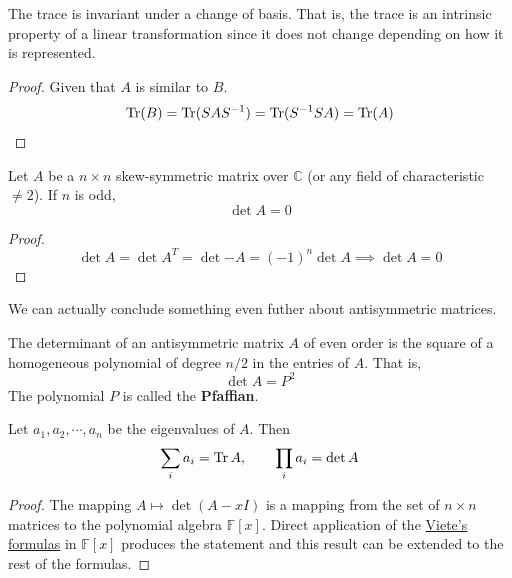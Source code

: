   \begin{corollary}
    \label{thm:invariance-of-the-trace-under-change-of-basis}
    The trace is invariant under a change of basis. That is, the trace is an intrinsic property of a linear transformation since it does not change depending on how it is represented. 
  \end{corollary}
  \begin{proof}
    Given that $A$ is similar to $B$. 
    \begin{equation}
      \operatorname{Tr}(B) = \operatorname{Tr}(S A S^{-1}) = \operatorname{Tr}(S^{-1} S A) = \operatorname{Tr}(A) 
    \end{equation}
  \end{proof}

  \begin{theorem}
    \label{thm:odd-order-skew-symmetric-matrices-are-singular}
    Let $A$ be a $n \times n$ skew-symmetric matrix over $\mathbb{C}$ (or any field of characteristic $\neq 2$). If $n$ is odd, 
    \begin{equation}
      \det{A} = 0 
    \end{equation}
  \end{theorem}
  \begin{proof}
    \begin{equation}
      \det{A} = \det{A^T} = \det{-A} = (-1)^n \det{A} \implies \det{A} = 0 
    \end{equation}
  \end{proof}

  We can actually conclude something even futher about antisymmetric matrices. 

  \begin{theorem}[Pfaffian]
    \label{thm:pfaffian}
    The determinant of an antisymmetric matrix $A$ of even order is the square of a homogeneous polynomial of degree $n/2$ in the entries of $A$. That is, 
    \begin{equation}
      \det{A} = P^2
    \end{equation}
    The polynomial $P$ is called the \textbf{Pfaffian}. 
  \end{theorem}

	\begin{theorem}[As Eigenvalues]
	  \label{thm:as-eigenvalues}
    Let $a_1, a_2, \cdots, a_n$ be the eigenvalues of $A$. Then 
		\begin{equation}
    	\sum_i a_i = \operatorname{Tr}{A}, \qquad \prod_i a_i = \det{A}
		\end{equation}
  \end{theorem}
  \begin{proof}
    The mapping $A \mapsto \det{(A - x I)}$ is a mapping from the set of $n \times n$ matrices to the polynomial algebra $\mathbb{F}[x]$. Direct application of the \hyperref[alg-thm:vietes-formulas]{Viete's formulas} in $\mathbb{F}[x]$ produces the statement and this result can be extended to the rest of the formulas. 
  \end{proof}


